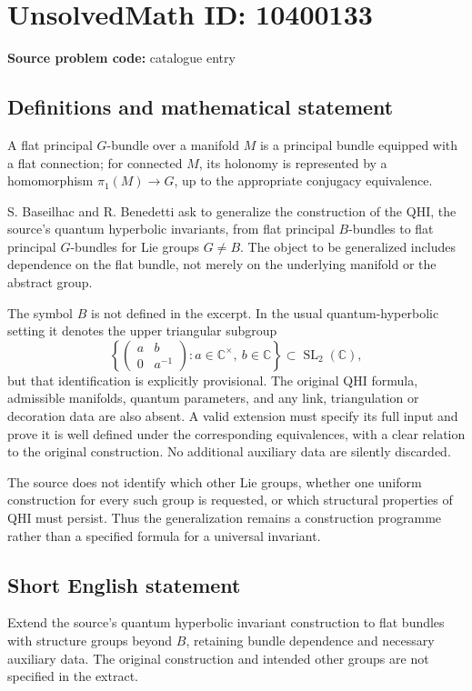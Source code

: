 \documentclass[11pt]{article}
\newcommand{\C}{\mathbb{C}}
\begin{document}
\section*{UnsolvedMath ID: 10400133}
\textbf{Source problem code:} catalogue entry
\subsection{Definitions and mathematical statement}
A flat principal \(G\)-bundle over a manifold \(M\) is a principal bundle equipped with a flat connection; for connected \(M\), its holonomy is represented by a homomorphism \(\pi_1(M)\to G\), up to the appropriate conjugacy equivalence.

S. Baseilhac and R. Benedetti ask to generalize the construction of the QHI, the source's quantum hyperbolic invariants, from flat principal \(B\)-bundles to flat principal \(G\)-bundles for Lie groups \(G\ne B\). The object to be generalized includes dependence on the flat bundle, not merely on the underlying manifold or the abstract group.

The symbol \(B\) is not defined in the excerpt. In the usual quantum-hyperbolic setting it denotes the upper triangular subgroup
\[
 \left\{\begin{pmatrix}a&b\\0&a^{-1}\end{pmatrix}:a\in\C^\times,\ b\in\C\right\}\subset\operatorname{SL}_2(\C),
\]
but that identification is explicitly provisional. The original QHI formula, admissible manifolds, quantum parameters, and any link, triangulation or decoration data are also absent. A valid extension must specify its full input and prove it is well defined under the corresponding equivalences, with a clear relation to the original construction. No additional auxiliary data are silently discarded.

The source does not identify which other Lie groups, whether one uniform construction for every such group is requested, or which structural properties of QHI must persist. Thus the generalization remains a construction programme rather than a specified formula for a universal invariant.
\subsection{Short English statement}
Extend the source's quantum hyperbolic invariant construction to flat bundles with structure groups beyond \(B\), retaining bundle dependence and necessary auxiliary data. The original construction and intended other groups are not specified in the extract.
\end{document}
